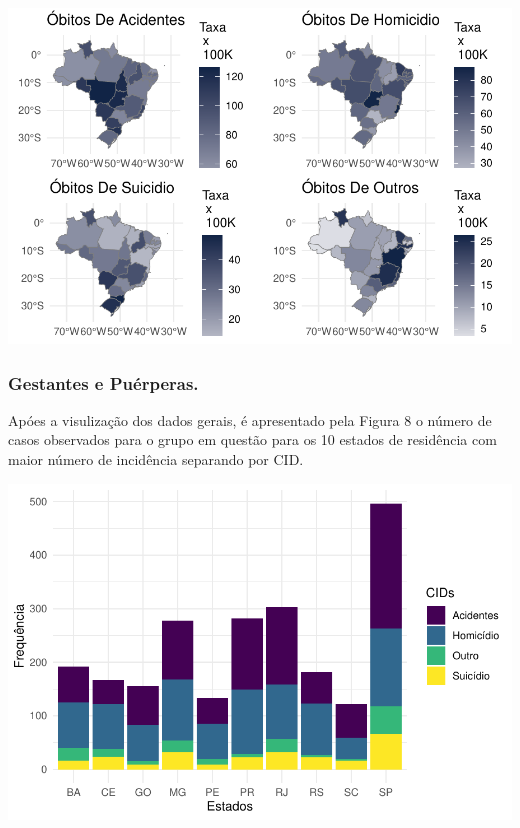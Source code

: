 \documentclass[
]{article}
\let\origfigure\figure
\let\endorigfigure\endfigure
\renewenvironment{figure}[1][2] {
    \expandafter\origfigure\expandafter[H]
} {
    \endorigfigure
}
\begin{document}
\begin{figure}
\centering
\includegraphics{RelatorioV02_files/figure-latex/unnamed-chunk-16-1.pdf}
\caption{Separados por CID}
\end{figure}

\hypertarget{gestantes-e-puuxe9rperas.-1}{%
\subsubsection{Gestantes e
Puérperas.}\label{gestantes-e-puuxe9rperas.-1}}

Apóes a visulização dos dados gerais, é apresentado pela Figura 8 o
número de casos observados para o grupo em questão para os 10 estados de
residência com maior número de incidência separando por CID.

\begin{figure}
\centering
\includegraphics{RelatorioV02_files/figure-latex/unnamed-chunk-17-1.pdf}
\caption{Estados por Número de CID`s para Gestantes e Puérperas}
\end{figure}
\end{document}
